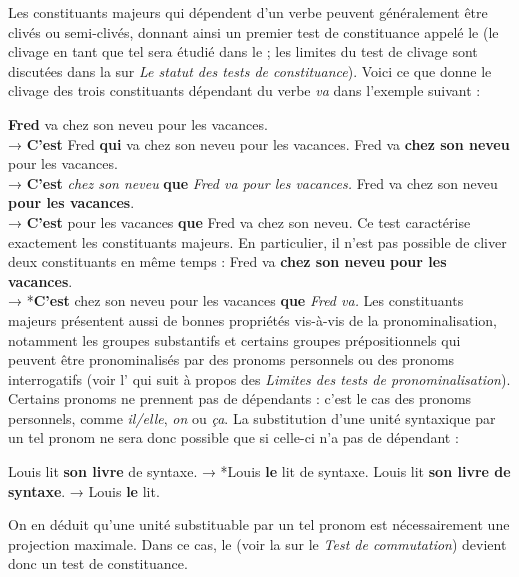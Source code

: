 Les constituants majeurs qui dépendent d’un verbe peuvent généralement être clivés ou semi-clivés, donnant ainsi un premier test de constituance appelé le  (le clivage en tant que tel sera étudié dans le  ; les limites du test de clivage sont discutées dans la  sur \textit{Le statut des tests de constituance}). Voici ce que donne le clivage des trois constituants dépendant du verbe \textit{va} dans l’exemple suivant :

\ea
\textbf{{Fred}}  {va chez son neveu pour les vacances.}\\
→ \textbf{{C’est}}  {Fred} \textbf{{qui}}  {va chez son neveu pour les vacances.}
\z
\ea
{Fred va} \textbf{{chez son neveu}}  {pour les vacances.}\\
→ \textbf{{C’est}} \textit{chez son neveu} \textbf{{que}} \textit{Fred va pour les vacances.}
\z
\ea
{Fred va chez son neveu} \textbf{{pour les vacances}}.\\
→ \textbf{{C’est}}  {pour les vacances} \textbf{{que}}  {Fred va chez son neveu.}
\z
Ce test caractérise exactement les constituants majeurs. En particulier, il n’est pas possible de cliver deux constituants en même temps :
\ea
{Fred va} \textbf{{chez son neveu}} \textbf{{pour les vacances}}.\\
→  *\textbf{{C’est}}  {chez son neveu pour les vacances} \textbf{{que}} \textit{Fred va.}
\z
Les constituants majeurs présentent aussi de bonnes propriétés vis-à-vis de la pronominalisation, notamment les groupes substantifs et certains groupes prépositionnels qui peuvent être pronominalisés par des pronoms personnels ou des pronoms interrogatifs (voir l’ qui suit à propos des \textit{Limites des tests de pronominalisation}). Certains pronoms ne prennent pas de dépendants : c’est le cas des pronoms personnels, comme \textit{il/elle}, \textit{on} ou \textit{ça}. La substitution d’une unité syntaxique par un tel pronom ne sera donc possible que si celle-ci n’a pas de dépendant :

\ea
    {Louis lit} \textbf{son livre}  {de syntaxe.}    →  *Louis \textbf{{le}}  {lit de syntaxe.}
\z
\ea
    {Louis lit} \textbf{{son livre de syntaxe}}.  →   {Louis} \textbf{{le}}  {lit.}
\z

On en déduit qu’une unité substituable par un tel pronom est nécessairement une projection maximale. Dans ce cas, le  (voir la  sur le \textit{Test de commutation}) devient donc un test de constituance.

